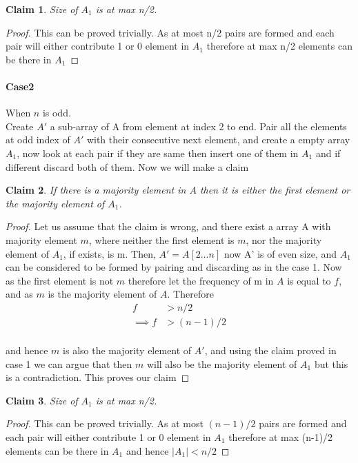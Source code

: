 \documentclass[answers]{exam}
\newtheorem{claim}{Claim}
\begin{document}
\begin{questions}
\begin{parts}
\begin{solution}
\begin{claim}
Size of $A_{1}$ is at max n/2. 
\end{claim}
\begin{proof}
This can be proved trivially. As at most n/2 pairs are formed and each pair will either contribute 1 or 0 element in $A_{1}$ therefore at max n/2 elements can be there in $A_{1}$
\end{proof}

\paragraph{Case2} When $n$ is odd.\\
Create $A'$ a sub-array of A from element at index 2 to end. Pair all the elements at odd index of $A'$ with their consecutive next element, and create a empty array $A_{1}$, now look at each pair if they are same then insert one of them in $A_{1}$ and if different discard both of them. Now we will make a claim

\begin{claim}
If there is a majority element in $A$ then it is either the first element or the majority element of $A_{1}$.
\end{claim}

\begin{proof}Let us assume that the claim is wrong, and there exist a array A with majority element $m$, where neither the first element is $m$, nor the majority element of $A_{1}$, if exists, is m.
\newline Then, $A'= A[2 \ldots n]$ now A' is of even size, and $A_{1}$ can be considered to be formed by pairing and discarding as in the case 1. Now as the first element is not $m$ therefore let the frequency of m in $A$ is equal to $f$, and as $m$ is the majority element of $A$. Therefore
\begin{align*}
f&>n/2\\
\implies f&>(n-1)/2\\
\end{align*}

and hence $m$ is also the majority element of $A'$, and using the claim proved in case 1 we can argue that then $m$ will also be the majority element of $A_1$ but this is a contradiction. This proves our claim
\end{proof}

\begin{claim}
Size of $A_{1}$ is at max n/2. 
\end{claim}
\begin{proof}
This can be proved trivially. As at most $(n-1)/2$ pairs are formed and each pair will either contribute 1 or 0 element in $A_{1}$ therefore at max (n-1)/2 elements can be there in $A_{1}$ and hence $|A_{1}|< n/2$
\end{proof}


\end{solution}
\end{parts}
\end{questions}
\end{document}
